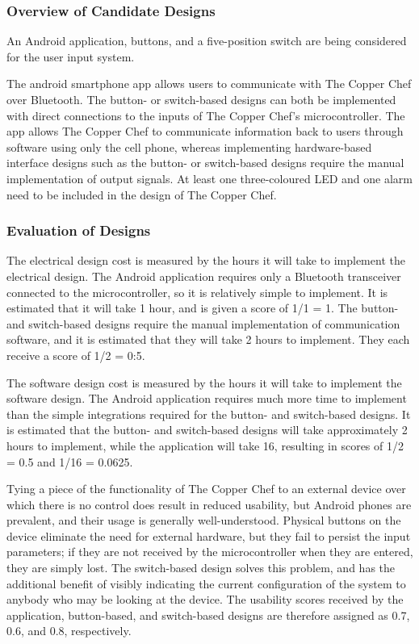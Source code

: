 \documentclass[11pt]{article}
\begin{document}
\subsubsection{Overview of Candidate Designs}

An Android application, buttons, and a five-position switch are being considered for the user input system.

The android smartphone app allows users to communicate with The Copper Chef over Bluetooth.
The button- or switch-based designs can both be implemented with direct connections to the inputs of The Copper Chef’s microcontroller.
The app allows The Copper Chef to communicate information back to users through software using only the cell phone, whereas implementing hardware-based interface designs such as the button- or switch-based designs require the manual implementation of output signals.
At least one three-coloured LED and one alarm need to be included in the design of The Copper Chef.

\subsubsection{Evaluation of Designs}

The electrical design cost is measured by the hours it will take to implement the electrical design.
The Android application requires only a Bluetooth transceiver connected to the microcontroller, so it is relatively simple to implement.
It is estimated that it will take 1 hour, and is given a score of 1/1 = 1.
The button- and switch-based designs require the manual implementation of communication software, and it is estimated that they will take 2 hours to implement.
They each receive a score of 1/2 = 0:5.

The software design cost is measured by the hours it will take to implement the software design.
The Android application requires much more time to implement than the simple integrations required for the button- and switch-based designs.
It is estimated that the button- and switch-based designs will take approximately 2 hours to implement, while the application will take 16, resulting in scores of 1/2 = 0.5 and 1/16 = 0.0625.

Tying a piece of the functionality of The Copper Chef to an external device over which there is no control does result in reduced usability, but Android phones are prevalent, and their usage is generally well-understood.
Physical buttons on the device eliminate the need for external hardware, but they fail to persist the input parameters; if they are not received by the microcontroller when they are entered, they are simply lost.
The switch-based design solves this problem, and has the additional benefit of visibly indicating the current configuration of the system to anybody who may be looking at the device.
The usability scores received by the application, button-based, and switch-based designs are therefore assigned as 0.7, 0.6, and 0.8, respectively.
\end{document}
